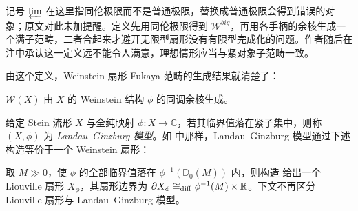 \begin{yizhu}[定义里的同伦极限]
记号 $\varprojlim$ 在这里指同伦极限而不是普通极限，替换成普通极限会得到错误的对象；原文对此未加提醒。定义先用同伦极限得到 $\mathcal{W}^{big}$，再用各手柄的余核生成一个满子范畴，二者合起来才避开无限型扇形没有有限型完成化的问题。作者随后在注中承认这一定义远不能令人满意，理想情形应当与紧对象子范畴一致。
\end{yizhu}

由这个定义，Weinstein 扇形 Fukaya 范畴的生成结果就清楚了：

\begin{lmm}\label{lmm:generation-Weinstein-sector}
    $\mathcal{W} (X)$ 由 $X$ 的 Weinstein 结构 $\phi$ 的同调余核生成。
\end{lmm}

给定 Stein 流形 $X$ 与全纯映射 $\phi\colon X\to\mathbb{C}$，若其临界值落在紧子集中，则称 $(X,\phi)$ 为 \emph{Landau--Ginzburg 模型}。如 \cite{GPS20} 中那样，Landau--Ginzburg 模型通过下述构造等价于一个 Weinstein 扇形：\par
取 $M\gg 0$，使 $\phi$ 的全部临界值落在 $\phi^{-1} (\mathbb{D}_0 (M))$ 内，则构造 \cite[Definition 2.14]{GPS20} 给出一个 Liouville 扇形 $X_{\phi}$，其扇形边界为 $\partial X_{\phi}\cong_{\operatorname{diff}} \phi^{-1} (M)\times\mathbb{R}$。下文不再区分 Liouville 扇形与 Landau--Ginzburg 模型。


